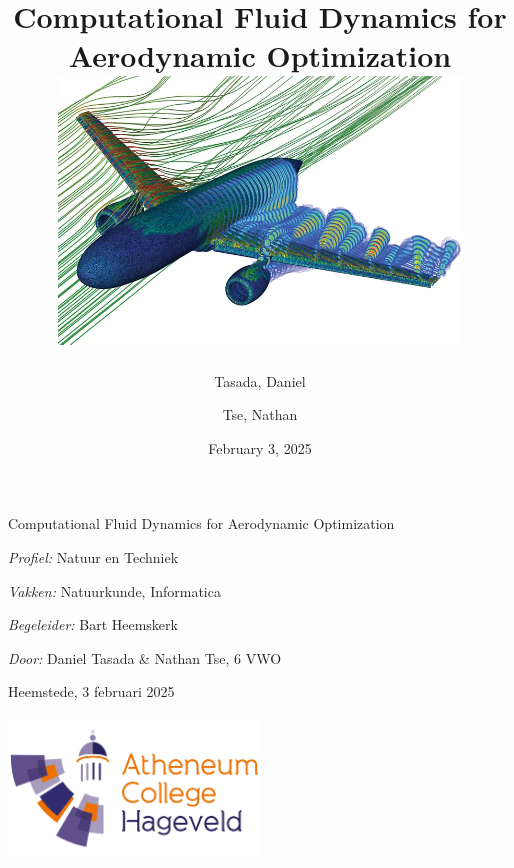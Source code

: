 \documentclass[a4paper,12pt,titlepage]{article}
\title{
	Computational Fluid Dynamics for Aerodynamic Optimization \vspace{1cm} \\
	\includegraphics[width=0.8\textwidth]{resources/title1.png}
}
\author{
  Tasada, Daniel\\
  \and
  Tse, Nathan\\
}
\date{February 3, 2025}
\begin{document}
\maketitle

\shipout\null

\begin{center}
    \vspace*{2cm}
    
    {\huge Computational Fluid Dynamics for Aerodynamic Optimization}
    
    \vspace{3cm}
    
    \textit{Profiel:} Natuur en Techniek
    
    \vspace{1cm}
    
    \textit{Vakken:} Natuurkunde, Informatica
    
    \vspace{1cm}
    
    \textit{Begeleider:} Bart Heemskerk
    
    \vspace{1cm}
    
    \textit{Door:} Daniel Tasada \& Nathan Tse, 6 VWO
    
    \vspace{1cm}
    
    Heemstede, 3 februari 2025
    
    \vspace{3cm}
    
    \includegraphics[width=0.5\textwidth]{resources/watermark.png}
\end{center}
\end{document}
